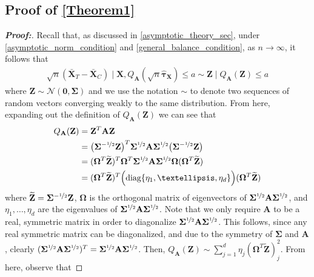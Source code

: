 \documentclass[11pt,twoside]{article}
\theoremstyle{definition}
\theoremstyle{remark}
\begin{document}
\subsection{Proof of \texorpdfstring{\cref{Theorem1}}{Theorem 1}} \label{theorem_1_proof}
\begin{proof}[\textbf{Proof:}]
Recall that, as discussed in \cref{asymptotic_theory_sec}, under \cref{asymptotic_norm_condition} and \cref{general_balance_condition}, as $n \to \infty$, it follows that
\begin{align*}
    \sqrt{n} \left(
        \bar{\mathbf{X}}_T - \bar{\mathbf{X}}_C \right) \mid \mathbf{X}, Q_{\mathbf{A}}(\sqrt{n} \widehat{\bm{\tau}}_{\mathbf{X}}) \leq a
    \sim \mathbf{Z} \mid Q_{\mathbf{A}}(\mathbf{Z}) \leq a
\end{align*}
where $\mathbf{Z} \sim \mathcal{N}(\mathbf{0}, \mathbf{\Sigma})$ and we use the notation $\sim$ to denote two sequences of random vectors converging weakly to the same distribution. From here, expanding out the definition of $Q_{\mathbf{A}}(\mathbf{Z})$ we can see that
\begin{align*}
    Q_{\mathbf{A}}(\mathbf{Z}) &= \mathbf{Z}^T \mathbf{A} \mathbf{Z}\\
    &=\big(\mathbf{\Sigma}^{-\nicefrac{1}{2}} \mathbf{Z} \big)^T \mathbf{\Sigma}^{\nicefrac{1}{2}} \mathbf{A} \mathbf{\Sigma}^{\nicefrac{1}{2}} \big(\mathbf{\Sigma}^{-\nicefrac{1}{2}} \mathbf{Z} \big) \\
    &= (\mathbf{\Omega}^T \widetilde{\mathbf{Z}})^T \mathbf{\Omega}^T \mathbf{\Sigma}^{\nicefrac{1}{2}} \mathbf{A} \mathbf{\Sigma}^{\nicefrac{1}{2}} \mathbf{\Omega} (\mathbf{\Omega}^T \widetilde{\mathbf{Z}}) \\
    &= (\mathbf{\Omega}^T \widetilde{\mathbf{Z}})^T \Big(\text{diag}\{\eta_1, \ldots, \eta_d \} \Big) (\mathbf{\Omega}^T \widetilde{\mathbf{Z}})
\end{align*}
where $\widetilde{\mathbf{Z}} = \mathbf{\Sigma}^{-\nicefrac{1}{2}} \mathbf{Z}$, $\mathbf{\Omega}$ is the orthogonal matrix of eigenvectors of $\mathbf{\Sigma}^{\nicefrac{1}{2}} \mathbf{A} \mathbf{\Sigma}^{\nicefrac{1}{2}}$, and $\eta_1, \ldots, \eta_d$ are the eigenvalues of $\mathbf{\Sigma}^{\nicefrac{1}{2}} \mathbf{A} \mathbf{\Sigma}^{\nicefrac{1}{2}}$. Note that we only require $\mathbf{A}$ to be a real, symmetric matrix in order to diagonalize $\mathbf{\Sigma}^{\nicefrac{1}{2}} \mathbf{A} \mathbf{\Sigma}^{\nicefrac{1}{2}}$. This follows, since any real symmetric matrix can be diagonalized, and due to the symmetry of $\mathbf{\Sigma}$ and $\mathbf{A}$, clearly $(\mathbf{\Sigma}^{\nicefrac{1}{2}} \mathbf{A} \mathbf{\Sigma}^{\nicefrac{1}{2}})^T = \mathbf{\Sigma}^{\nicefrac{1}{2}} \mathbf{A} \mathbf{\Sigma}^{\nicefrac{1}{2}}$. Then, $Q_{\mathbf{A}}(\mathbf{Z}) \sim \sum^d_{j=1} \eta_j (\mathbf{\Omega}^T \widetilde{\mathbf{Z}})^2_j$. From here, observe that

\end{proof}
\end{document}
